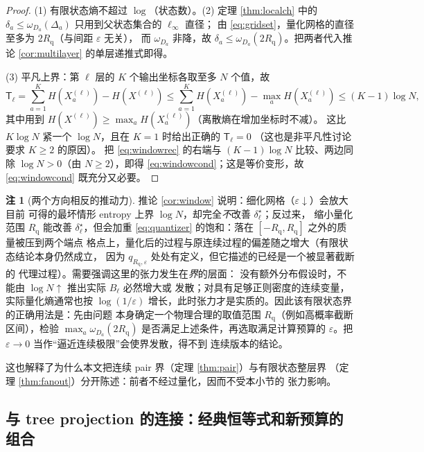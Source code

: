 \documentclass[a4paper,11pt]{article}
\theoremstyle{definition}
\newtheorem{remark}{注}
\newcommand{\1}{\mathbf 1}
\newcommand{\TCs}{\mathsf T}
\newcommand{\Rq}{R_{\mathrm{q}}}
\begin{document}
\begin{proof}
(1) 有限状态熵不超过 $\log$（状态数）。(2) 定理 \ref{thm:localch} 中的
$\delta_a\le\omega_{D_a}(\Delta_a)$ 只用到父状态集合的 $\ell_\infty$ 直径；
由 \eqref{eq:gridset}，量化网格的直径至多为 $2\Rq $（与间距 $\varepsilon$ 无关），
而 $\omega_{D_a}$ 非降，故 $\delta_a\le\omega_{D_a}(2\Rq )$。把两者代入推论
\ref{cor:multilayer} 的单层递推式即得。

(3) 平凡上界：第 $\ell$ 层的 $K$ 个输出坐标各取至多 $N$ 个值，故
\[
\TCs_\ell
=\sum_{a=1}^{K}H(X^{(\ell)}_a)-H(X^{(\ell)})
\le
\sum_{a=1}^{K}H(X^{(\ell)}_a)-\max_{a}H(X^{(\ell)}_a)
\le
(K-1)\log N,
\]
其中用到 $H(X^{(\ell)})\ge\max_aH(X^{(\ell)}_a)$（离散熵在增加坐标时不减）。
这比 $K\log N$ 紧一个 $\log N$，且在 $K=1$ 时给出正确的 $\TCs_\ell=0$
（这也是非平凡性讨论要求 $K\ge2$ 的原因）。
把 \eqref{eq:windowrec} 的右端与 $(K-1)\log N$ 比较、两边同除
$\log N>0$（由 $N\ge2$），即得 \eqref{eq:windowcond}；这是等价变形，故
\eqref{eq:windowcond} 既充分又必要。
\end{proof}

\begin{remark}[两个方向相反的推动力]
\label{rem:windowtension}
推论 \ref{cor:window} 说明：细化网格（$\varepsilon\downarrow$）会放大目前
可得的最坏情形 entropy 上界 $\log N$，却完全\emph{不}改善
$\delta^\star_\ell$；反过来，
缩小量化范围 $\Rq$ 能改善 $\delta^\star_\ell$，但会加重
\eqref{eq:quantizer} 的饱和：落在 $[-\Rq,\Rq]$ 之外的质量被压到两个端点
格点上，量化后的过程与原连续过程的偏差随之增大（有限状态结论本身仍然成立，
因为 $q_{\Rq,\varepsilon}$ 处处有定义，但它描述的已经是一个被显著截断的
代理过程）。需要强调这里的张力发生在\emph{界}的层面：
没有额外分布假设时，不能由 $\log N\uparrow$ 推出实际 $B_\ell$ 必然增大或
发散；对具有足够正则密度的连续变量，实际量化熵通常也按 $\log(1/\varepsilon)$
增长，此时张力才是实质的。因此该有限状态界的正确用法是：先由问题
本身确定一个物理合理的取值范围 $\Rq$（例如高概率截断区间），检验
$\max_a\omega_{D_a}(2\Rq )$ 是否满足上述条件，再选取满足计算预算的
$\varepsilon$。把 $\varepsilon\to0$ 当作“逼近连续极限”会使界发散，得不到
连续版本的结论。

这也解释了为什么本文把连续 pair 界（定理 \ref{thm:pair}）与有限状态整层界
（定理 \ref{thm:fanout}）分开陈述：前者不经过量化，因而不受本小节的
张力影响。
\end{remark}

\subsection{与 tree projection 的连接：经典恒等式和新预算的组合}
\label{sec:treeproj}
\end{document}
